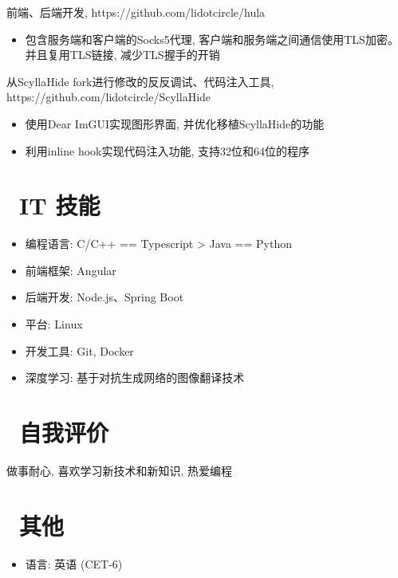 \documentclass{resume}
\begin{document}
\begin{onehalfspacing}
前端、后端开发, https://github.com/lidotcircle/hula
\begin{itemize}
  \item 包含服务端和客户端的Socks5代理, 客户端和服务端之间通信使用TLS加密。并且复用TLS链接, 减少TLS握手的开销
\end{itemize}
\end{onehalfspacing}

\begin{onehalfspacing}
从ScyllaHide fork进行修改的反反调试、代码注入工具, https://github.com/lidotcircle/ScyllaHide
\begin{itemize}
  \item 使用Dear ImGUI实现图形界面, 并优化移植ScyllaHide的功能
  \item 利用inline hook实现代码注入功能, 支持32位和64位的程序
\end{itemize}
\end{onehalfspacing}

\section{\faCogs\ IT 技能}
\begin{itemize}[parsep=0.5ex]
  \item 编程语言: C/C++ == Typescript > Java == Python
  \item 前端框架: Angular
  \item 后端开发: Node.js、Spring Boot
  \item 平台: Linux
  \item 开发工具: Git, Docker
  \item 深度学习: 基于对抗生成网络的图像翻译技术
\end{itemize}

\section{\faArrowCircleRight\ 自我评价}
做事耐心, 喜欢学习新技术和新知识, 热爱编程

\section{\faInfo\ 其他}
\begin{itemize}[parsep=0.5ex]
  \item 语言: 英语 (CET-6)
\end{itemize}

%
%
\end{document}
